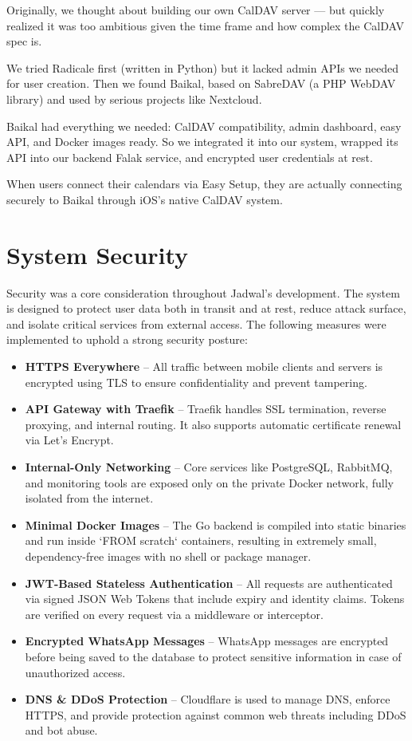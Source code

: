 Originally, we thought about building our own CalDAV server — but quickly realized it was too ambitious given the time frame and how complex the CalDAV spec is.

We tried Radicale first (written in Python) but it lacked admin APIs we needed for user creation. Then we found Baikal, based on SabreDAV (a PHP WebDAV library) and used by serious projects like Nextcloud.

Baikal had everything we needed: CalDAV compatibility, admin dashboard, easy API, and Docker images ready. So we integrated it into our system, wrapped its API into our backend Falak service, and encrypted user credentials at rest.

When users connect their calendars via Easy Setup, they are actually connecting securely to Baikal through iOS’s native CalDAV system.

\section{System Security}

Security was a core consideration throughout Jadwal's development. The system is designed to protect user data both in transit and at rest, reduce attack surface, and isolate critical services from external access. The following measures were implemented to uphold a strong security posture:

\begin{itemize}
    \item \textbf{HTTPS Everywhere} – All traffic between mobile clients and servers is encrypted using TLS to ensure confidentiality and prevent tampering.
    \item \textbf{API Gateway with Traefik} – Traefik handles SSL termination, reverse proxying, and internal routing. It also supports automatic certificate renewal via Let's Encrypt.
    \item \textbf{Internal-Only Networking} – Core services like PostgreSQL, RabbitMQ, and monitoring tools are exposed only on the private Docker network, fully isolated from the internet.
    \item \textbf{Minimal Docker Images} – The Go backend is compiled into static binaries and run inside `FROM scratch` containers, resulting in extremely small, dependency-free images with no shell or package manager.
    \item \textbf{JWT-Based Stateless Authentication} – All requests are authenticated via signed JSON Web Tokens that include expiry and identity claims. Tokens are verified on every request via a middleware or interceptor.
    \item \textbf{Encrypted WhatsApp Messages} – WhatsApp messages are encrypted before being saved to the database to protect sensitive information in case of unauthorized access.
    \item \textbf{DNS \& DDoS Protection} – Cloudflare is used to manage DNS, enforce HTTPS, and provide protection against common web threats including DDoS and bot abuse.
\end{itemize}

